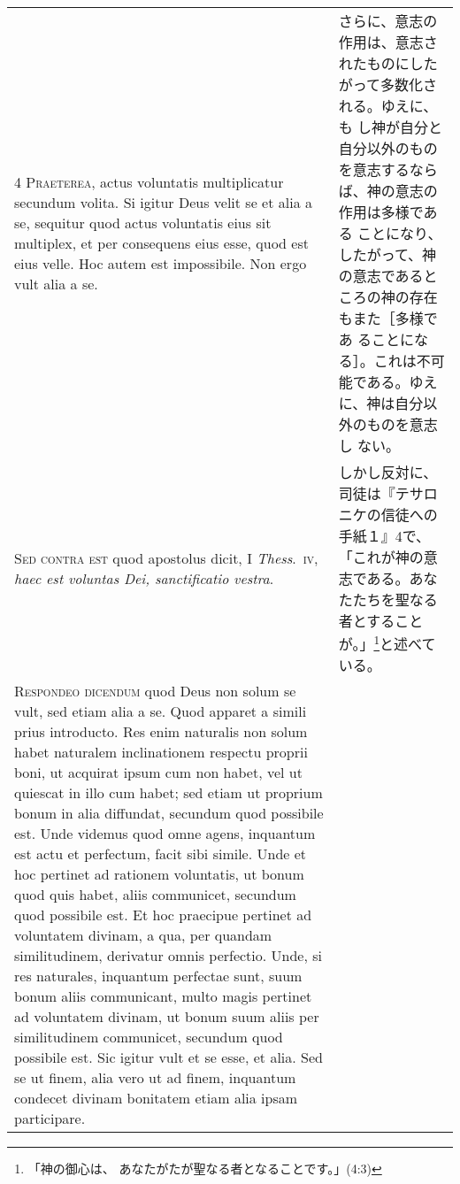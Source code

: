 \documentclass[10pt]{jsarticle} %
\begin{document}
\begin{longtable}{p{21em}p{21em}}
\\





{\scshape 4 Praeterea}, actus voluntatis multiplicatur secundum
 volita. Si igitur Deus velit se et alia a se, sequitur quod actus
 voluntatis eius sit multiplex, et per consequens eius esse, quod est
 eius velle. Hoc autem est impossibile. Non ergo vult alia a se.


&

さらに、意志の作用は、意志されたものにしたがって多数化される。ゆえに、も
 し神が自分と自分以外のものを意志するならば、神の意志の作用は多様である
 ことになり、したがって、神の意志であるところの神の存在もまた［多様であ
 ることになる］。これは不可能である。ゆえに、神は自分以外のものを意志し
 ない。

\\





{\scshape  Sed contra est} quod apostolus dicit, I {\itshape Thess}.~{\scshape iv}, {\itshape haec est
 voluntas Dei, sanctificatio vestra}.


&

しかし反対に、司徒は『テサロニケの信徒への手紙１』4で、「これが神の意
 志である。あなたたちを聖なる者とすることが。」\footnote{「神の御心は、
 あなたがたが聖なる者となることです。」(4:3)}と述べている。


\\





{\scshape Respondeo dicendum} quod Deus non solum se vult, sed etiam
 alia a se. Quod apparet a simili prius introducto. Res enim naturalis
 non solum habet naturalem inclinationem respectu proprii boni, ut
 acquirat ipsum cum non habet, vel ut quiescat in illo cum habet; sed
 etiam ut proprium bonum in alia diffundat, secundum quod possibile
 est. Unde videmus quod omne agens, inquantum est actu et perfectum,
 facit sibi simile. Unde et hoc pertinet ad rationem voluntatis, ut
 bonum quod quis habet, aliis communicet, secundum quod possibile
 est. Et hoc praecipue pertinet ad voluntatem divinam, a qua, per
 quandam similitudinem, derivatur omnis perfectio. Unde, si res
 naturales, inquantum perfectae sunt, suum bonum aliis communicant,
 multo magis pertinet ad voluntatem divinam, ut bonum suum aliis per
 similitudinem communicet, secundum quod possibile est. Sic igitur vult
 et se esse, et alia. Sed se ut finem, alia vero ut ad finem, inquantum
 condecet divinam bonitatem etiam alia ipsam participare.



\end{longtable}
\end{document}
